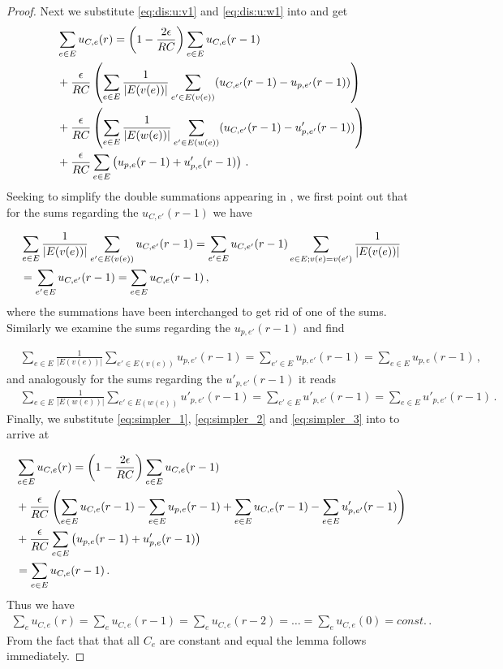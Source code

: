\begin{proof}
Next we substitute \eqref{eq:dis:u:v1} and \eqref{eq:dis:u:w1} into  and get
\begin{align}\label{eq:key_substituted}
&\sum_{e\in E} u_{C,e}(r) = \left( 1 - \frac{2 \epsilon}{RC}\right) \sum_{e\in E} u_{C,e}(r - 1)  \\\notag
&+ \frac{\epsilon}{RC}\left( \sum_{e \in E}\frac{1}{|E(v(e))|}\sum_{e' \in E(v(e))}(u_{C,e'}(r-1)-u_{p,e'}(r-1)) \right)\\\notag
&+ \frac{\epsilon}{RC}\left( \sum_{e \in E}\frac{1}{|E(w(e))|}\sum_{e' \in E(w(e))}(u_{C,e'}(r-1)-u_{p,e'}'(r-1)) \right) \\\notag
&+ \frac{\epsilon}{RC} \sum_{e\in E} \left(u_{p,e}(r-1) + u'_{p,e}(r - 1)\right)\,.
\end{align}
Seeking to simplify the double summations appearing in , we first point out that for the sums regarding the $u_{C,e'}(r - 1)$ we have

\begin{align}\label{eq:simpler_1}
& \sum_{e\in E} \frac{1}{|E(v(e))|} \sum_{e' \in E(v(e))} u_{C,e'}(r - 1) = \sum_{e' \in E} u_{C,e'}(r-1) \sum_{e \in E; v(e) = v(e')}  \frac{1}{|E(v(e))|} \\\notag
&= \sum_{e' \in E} u_{C,e'}(r-1) = \sum_{e \in E} u_{C,e}(r-1)\,,
\end{align}
where the summations have been interchanged to get rid of one of the sums. Similarly we examine the sums regarding the $u_{p,e'}(r-1)$ and find

\begin{align}\label{eq:simpler_2}
& \sum_{e\in E} \frac{1}{|E(v(e))|} \sum_{e' \in E(v(e))} u_{p,e'}(r - 1) = \sum_{e' \in E} u_{p,e'}(r-1) = \sum_{e \in E} u_{p,e}(r-1)\,,
\end{align}
and analogously for the sums regarding the $u'_{p,e'}(r-1)$ it reads
\begin{align}\label{eq:simpler_3}
& \sum_{e\in E} \frac{1}{|E(w(e))|} \sum_{e' \in E(w(e))} u'_{p,e'}(r - 1) = \sum_{e' \in E} u'_{p,e'}(r-1) = \sum_{e \in E} u'_{p,e'}(r-1)\,.
\end{align}
Finally, we substitute \eqref{eq:simpler_1}, \eqref{eq:simpler_2} and \eqref{eq:simpler_3} into  to arrive at

\begin{align}\label{eq:key_substituted_2}
&\sum_{e\in E} u_{C,e}(r) = \left( 1 - \frac{2 \epsilon}{RC}\right) \sum_{e\in E} u_{C,e}(r - 1)  \\\notag
&+ \frac{\epsilon}{RC}\left( \sum_{e \in E} u_{C,e}(r-1) - \sum_{e \in E} u_{p,e}(r-1) + \sum_{e \in E} u_{C,e}(r-1) -\sum_{e \in E} u'_{p,e'}(r-1) \right)\\\notag
&+ \frac{\epsilon}{RC} \sum_{e\in E} \left(u_{p,e}(r-1) + u'_{p,e}(r - 1)\right) \\\notag
&= \sum_{e\in E} u_{C,e}(r - 1)\,.
\end{align}
Thus we have 
\begin{align}
	\sum_e u_{C,e}(r) = \sum_e u_{C,e}(r - 1) =  \sum_e u_{C,e}(r - 2) = \ldots = \sum_e u_{C,e}(0) = const.\,.
\end{align}
From the fact that that all $C_e$ are constant and equal the lemma follows immediately.

\end{proof}